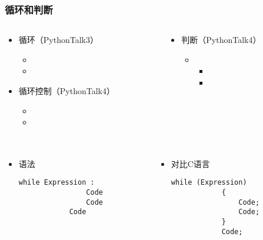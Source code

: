 \begin{frame} [fragile]
	\frametitle{循环和判断}
	\linespread{2}
	\begin{columns}[T]
		\begin{column}[T]{.5\textwidth}
			\begin{itemize}
			\item 循环（PythonTalk3）
				\begin{itemize}
				\item {}
				\item {}
				\end{itemize}
			\item 循环控制（PythonTalk4）
				\begin{itemize}
				\item {}
				\item {}
				\end{itemize}
			\end{itemize}
		\end{column}
		\begin{column}[T]{.5\textwidth}
			\begin{itemize}
			\item 判断（PythonTalk4）
				\begin{itemize}
				\item {}
					\begin{itemize}
					\item {}
					\item {}
					\end{itemize}
				\end{itemize}
			\end{itemize}
		\end{column}
	\end{columns}
\end{frame}

\begin{frame} [fragile]
	\frametitle{}
	\linespread{1.5}
	\begin{columns}[T]
		\begin{column}[T]{.5\textwidth}
			\begin{itemize}
			\item 语法
			\begin{lstlisting}[style=pythonstyle, gobble=12]
			while Expression :
				Code
				Code
			Code
			\end{lstlisting}
			\end{itemize}
		\end{column}
		\begin{column}[T]{.5\textwidth}
			\begin{itemize}
			\item 对比C语言
			\begin{lstlisting}[style=cstyle, gobble=12]
			while (Expression)
			{
				Code;
				Code;
			}
			Code;
			\end{lstlisting}
			\end{itemize}
		\end{column}
	\end{columns}
\end{frame}

